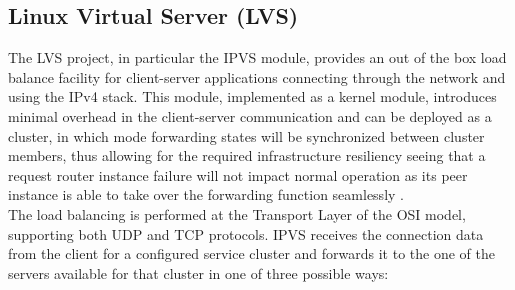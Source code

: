 \subsection{Linux Virtual Server (LVS)}
The \gls{LVS} project, in particular the \gls{IPVS} module, provides an out of the box load balance facility for client-server applications connecting through the network and using the \gls{IPv4} stack.
This module, implemented as a kernel module, introduces minimal overhead in the client-server communication and can be deployed as a cluster, in which mode forwarding states will be synchronized between cluster members, thus allowing for the required infrastructure resiliency seeing that a request router instance failure will not impact normal operation as its peer instance is able to take over the forwarding function seamlessly \cite{LVSSync}.\\
%
The load balancing is performed at the Transport Layer of the \gls{OSI} model, supporting both \gls{UDP} and \gls{TCP} protocols.
IPVS receives the connection data from the client for a configured service cluster and forwards it to the one of the servers available for that cluster in one of three possible ways\cite{IPVSHow}:
